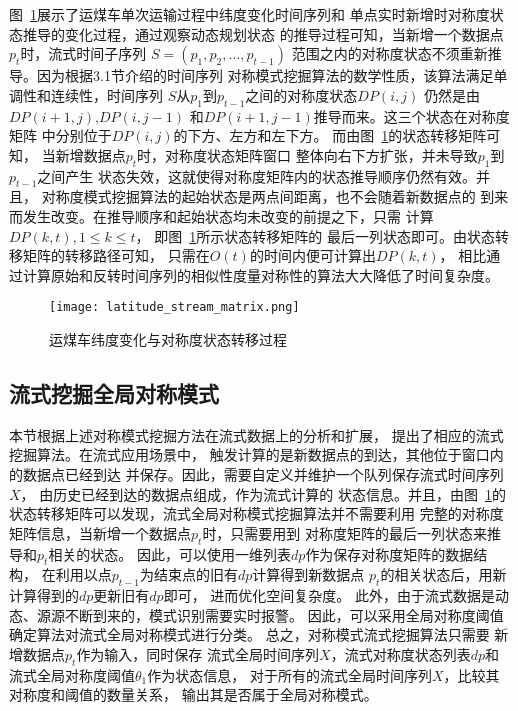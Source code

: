 图~\ref{fig:latitude_stream_matrix}展示了运煤车单次运输过程中纬度变化时间序列和
单点实时新增时对称度状态推导的变化过程，通过观察动态规划状态
的推导过程可知，当新增一个数据点$p_t$时，流式时间子序列
$S=\left(p_{1},p_{2},\dots,p_{t-1} \right)$
范围之内的对称度状态不须重新推导。因为根据3.1节介绍的时间序列
对称模式挖掘算法的数学性质，该算法满足单调性和连续性，时间序列
$S$从$p_{1}$到$p_{t-1}$之间的对称度状态$DP\left(i,j\right)$
仍然是由$DP\left(i+1,j\right)$,$DP\left(i,j-1\right)$
和$DP\left(i+1,j-1\right)$推导而来。这三个状态在对称度矩阵
中分别位于$DP\left(i,j\right)$的下方、左方和左下方。
而由图~\ref{fig:latitude_stream_matrix}的状态转移矩阵可知，
当新增数据点$p_t$时，对称度状态矩阵窗口
整体向右下方扩张，并未导致$p_{1}$到$p_{t-1}$之间产生
状态失效，这就使得对称度矩阵内的状态推导顺序仍然有效。并且，
对称度模式挖掘算法的起始状态是两点间距离，也不会随着新数据点的
到来而发生改变。在推导顺序和起始状态均未改变的前提之下，只需
计算$DP\left(k,t\right),1\leq k \leq t$，
即图~\ref{fig:latitude_stream_matrix}所示状态转移矩阵的
最后一列状态即可。由状态转移矩阵的转移路径可知，
只需在$O\left(t\right)$的时间内便可计算出$DP\left(k,t\right)$，
相比通过计算原始和反转时间序列的相似性度量对称性的算法大大降低了时间复杂度。
\begin{figure}
  \centering
  \texttt{[image: latitude\_stream\_matrix.png]}
  \caption{运煤车纬度变化与对称度状态转移过程}
  \label{fig:latitude_stream_matrix}
\end{figure}

\subsection{流式挖掘全局对称模式}
本节根据上述对称模式挖掘方法在流式数据上的分析和扩展，
提出了相应的流式挖掘算法。在流式应用场景中，
触发计算的是新数据点的到达，其他位于窗口内的数据点已经到达
并保存。因此，需要自定义并维护一个队列保存流式时间序列$X$，
由历史已经到达的数据点组成，作为流式计算的
状态信息。并且，由图~\ref{fig:latitude_stream_matrix}的
状态转移矩阵可以发现，流式全局对称模式挖掘算法并不需要利用
完整的对称度矩阵信息，当新增一个数据点$p_t$时，只需要用到
对称度矩阵的最后一列状态来推导和$p_t$相关的状态。
因此，可以使用一维列表$dp$作为保存对称度矩阵的数据结构，
在利用以点$p_{t-1}$为结束点的旧有$dp$计算得到新数据点
$p_t$的相关状态后，用新计算得到的$dp$更新旧有$dp$即可，
进而优化空间复杂度。
此外，由于流式数据是动态、源源不断到来的，模式识别需要实时报警。
因此，可以采用全局对称度阈值确定算法对流式全局对称模式进行分类。
总之，对称模式流式挖掘算法只需要
新增数据点$p_t$作为输入，同时保存
流式全局时间序列$X$，流式对称度状态列表$dp$和
流式全局对称度阈值$\theta_1$作为状态信息，
对于所有的流式全局时间序列$X$，比较其对称度和阈值的数量关系，
输出其是否属于全局对称模式。

